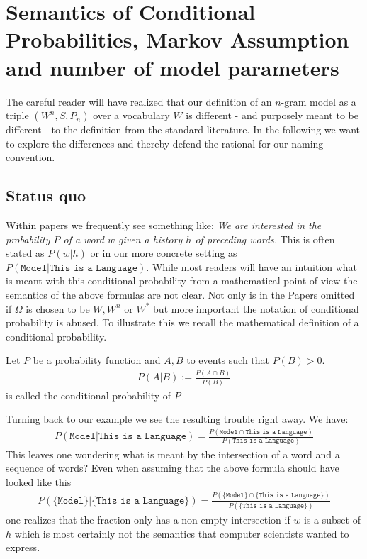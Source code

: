 \documentclass[•]{book}
\begin{document}
\section{Semantics of Conditional Probabilities, Markov Assumption and number of model parameters}
The careful reader will have realized that our definition of an $n$-gram model as a triple $(W^n,S,P_n)$ over a vocabulary $W$ is different - and purposely meant to be different - to the definition from the standard literature.
In the following we want to explore the differences and thereby defend the rational for our naming convention. 

\subsection{Status quo}
Within papers we frequently see something like: \textit{We are interested in the probability $P$ of a word $w$ given a history $h$ of preceding words.}
This is often stated as $P(w|h)$ or in our more concrete setting as $P(\texttt{Model}|\texttt{This is a Language})$. 
While most readers will have an intuition what is meant with this conditional probability from a mathematical point of view the semantics of the above formulas are not clear.
Not only is in the Papers omitted if $\Omega$ is chosen to be $W, W^n$ or $W^{*}$ but more important the notation of conditional probability is abused.
To illustrate this we recall the mathematical definition of a conditional probability.
\begin{definition}
Let $P$ be a probability function and $A,B$ to events such that $P(B)>0$.
\begin{align}
P(A|B):=\frac{P(A\cap B)}{P(B)}
\end{align}
is called the conditional probability of $P$
\end{definition}

Turning back to our example we see the resulting trouble right away. 
We have: 
\begin{align}
P(\texttt{Model}|\texttt{This is a Language}) = \frac{P(\texttt{Model}\cap\texttt{This is a Language})}{P(\texttt{This is a Language})}
\end{align}
This leaves one wondering what is meant by the intersection of a word and a sequence of words?
Even when assuming that the above formula should have looked like this
\begin{align}
P(\{\texttt{Model}\}|\{\texttt{This is a Language}\}) = \frac{P(\{\texttt{Model}\}\cap\{\texttt{This is a Language}\})}{P(\{\texttt{This is a Language}\})}
\end{align}
one realizes that the fraction only has a non empty intersection if $w$ is a subset of $h$ which is most certainly not the semantics that computer scientists wanted to express. 
\end{document}
